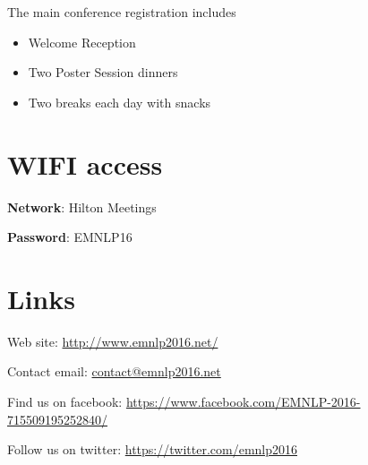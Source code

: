 The main conference registration includes
\begin{itemize}
\item Welcome Reception
\item Two Poster Session dinners  
\item Two breaks each day with snacks
\end{itemize}

\section*{WIFI access}

\textbf{Network}: Hilton Meetings

\textbf{Password}: EMNLP16


\section*{Links}

Web site: \url{http://www.emnlp2016.net/}

Contact email: \url{contact@emnlp2016.net}

Find us on facebook: \url{https://www.facebook.com/EMNLP-2016-715509195252840/}

Follow us on twitter: \url{https://twitter.com/emnlp2016}



\clearpage{}\thispagestyle{empty}